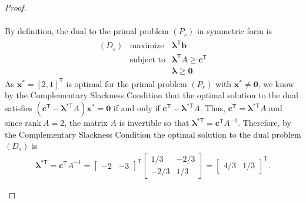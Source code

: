 \documentclass[12pt]{article}
\theoremstyle{definition}
\newcommand{\vc}[1]{\boldsymbol{#1}}
\newcommand{\tran}{\mathsf{T}}
\begin{document}
\begin{proof}
\begin{enumerate}
\begin{align*}
      \end{align*}
      By definition, the dual to the primal problem $(P_s)$ in symmetric form is
      \begin{align*}
        \begin{array}{rrl}
          (D_s) & \text{maximize} & \vc{\lambda}^\tran\vc{b}  \\
          & \text{subject to} & \vc{\lambda}^\tran A\geq \vc{c}^\tran\\
          & & \vc{\lambda} \geq \vc{0}.
        \end{array}
      \end{align*}
      As $\vc{x}^{*} = [2,1]^\tran$ is optimal for the primal problem $(P_s)$ with $\vc{x}^{*} \neq \vc{0}$,
      we know by the Complementary Slackness Condition that the optimal solution to the dual satisfies
      $(\vc{c}^\tran - \vc{\lambda}^{*\tran} A)\vc{x}^{*} = \vc{0}$ if
      and only if $\vc{c}^\tran - \vc{\lambda}^{*\tran} A$. Thus, $\vc{c}^\tran = \vc{\lambda}^{*\tran} A$ and since $\text{rank}\ A = 2$, the matrix $A$
      is invertible so that $\vc{\lambda}^{*\tran} = \vc{c}^\tran A^{-1}$. Therefore, by the Complementary Slackness Condition
      the optimal solution to the dual problem $(D_s)$ is
      \begin{align*}
        \vc{\lambda}^{*\tran} = \vc{c}^\tran A^{-1} = \begin{bmatrix}-2 & -3\end{bmatrix}^\tran\begin{bmatrix}1/3 & -2/3 \\ -2/3 & 1/3 \end{bmatrix} = \begin{bmatrix}4/3 & 1/3\end{bmatrix}^\tran.
      \end{align*}
  \end{enumerate}
\end{proof}
\newpage
\end{document}
